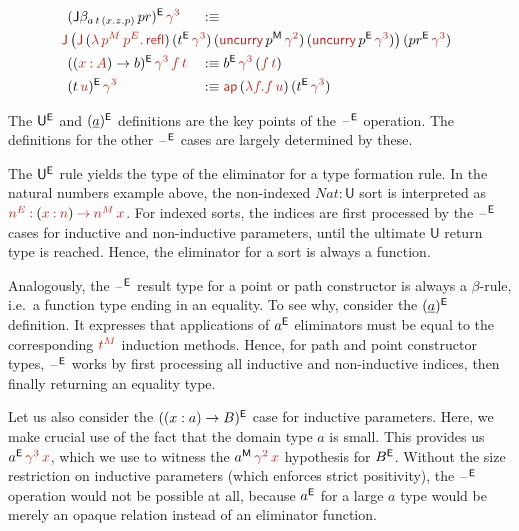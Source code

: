 \documentclass[a4paper,UKenglish]{lipics-v2018}
\newcommand{\U}{\mathsf{U}}
\newcommand{\ra}{\rightarrow}
\newcommand{\blank}{\mathord{\hspace{1pt}\text{--}\hspace{1pt}}} %
\newcommand{\M}{\mathsf{M}}
\newcommand{\refl}{\mathsf{refl}}
\newcommand{\1}{\mathsf{1}} \renewcommand{\Pr}{\mathsf{Pr}}
\renewcommand{\in}{\mathbin{\hat:}}
\renewcommand{\hat}[1]{{\color{BrickRed}{#1}}}
\newcommand{\rah}{\mathbin{\hat\ra}}
\newcommand{\ap}{\hat{\mathsf{ap}}}
\begin{document}
\begin{alignat*}{5}
  & (\J\beta_{a\,t\,(x.z.p)}\,pr)^\E\,\hat{\gamma^3} && :\equiv \\
  & && \hspace{-10em}\hat{\J}\,\big(\hat{\J}\,(\hat{\lambda}\,\hat{p^M}\,\hat{p^E}\hat{.}\,\hat{\refl})\,(t^\E\,\hat{\gamma^3})\,(\hat{\mathsf{uncurry}}\,p^\M\,\hat{\gamma^2})\,(\hat{\mathsf{uncurry}}\,p^\E\,\hat{\gamma^3})\big)\,(pr^\E\,\hat{\gamma^3})\\
  & ((\hat{x}\in \hat{A})\ra b)^\E\,\hat{\gamma^3\,f\,t} && :\equiv b^\E\,\hat{\gamma^3}\,(\hat{f}\,\hat{t}) \\
  & (t\,\hat{u})^\E\,\hat{\gamma^3} && :\equiv \ap\,(\hat{\lambda} \hat{f.}\hat{f}\,\hat{u})\,(t^\E\,\hat{\gamma^3})
\end{alignat*}

The $\U^\E$ and $(\underline{a})^{\mathsf{E}}$ definitions are the key points of
the $\blank^\E$ operation. The definitions for the other $\blank^\E$
cases are largely determined by these.

The $\U^\E$ rule yields the type of the eliminator for a type
formation rule. In the natural numbers example above, the non-indexed
$Nat : \U$ sort is interpreted as $\hat{n^E} \in (\hat{x}\in
\hat{n})\rah \hat{n^M}\,\hat{x}$. For indexed sorts, the indices are
first processed by the $\blank^\E$ cases for inductive and non-inductive
parameters, until the ultimate $\U$ return type is reached. Hence, the
eliminator for a sort is always a function.

Analogously, the $\blank^\E$ result type for a point or path constructor is
always a $\beta$-rule, i.e.\ a function type ending in an equality. To
see why, consider the $(\underline{a})^{\mathsf{E}}$ definition. It expresses
that applications of $a^{\mathsf{E}}$ eliminators must be equal to the
corresponding $\hat{t^M}$ induction methods. Hence, for path and point
constructor types, $\blank^\E$ works by first processing all inductive and
non-inductive indices, then finally returning an equality type.

Let us also consider the $((x:a)\ra B)^\E$ case for inductive
parameters. Here, we make crucial use of the fact that the domain type
$a$ is small. This provides us $a^\E\,\hat{\gamma^3\,x}$, which we use
to witness the $a^\M\,\hat{\gamma^2}\,\hat{x}$ hypothesis for
$B^{\mathsf{E}}$. Without the size restriction on inductive parameters (which
enforces strict positivity), the $\blank^\E$ operation would not be
possible at all, because $a^{\mathsf{E}}$ for a large $a$ type would be merely
an opaque relation instead of an eliminator function.
\end{document}
